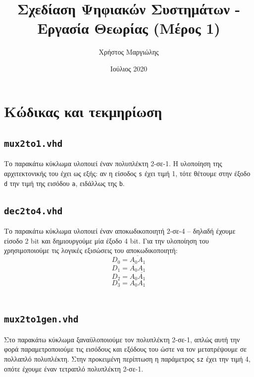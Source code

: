 \documentclass{article}
\title{Σχεδίαση Ψηφιακών Συστημάτων - Εργασία Θεωρίας (Μέρος 1)}
\author{Χρήστος Μαργιώλης}
\date{Ιούλιος 2020}
\begin{document}
\begin{titlepage}
        \maketitle
\end{titlepage}

\renewcommand{\contentsname}{Περιεχόμενα}
\tableofcontents

\section{Κώδικας και τεκμηρίωση}

\subsection{\lstinline{mux2to1.vhd}}

Το παρακάτω κύκλωμα υλοποιεί έναν πολυπλέκτη 2-σε-1. Η υλοποίηση της
αρχιτεκτονικής του έχει ως εξής: αν η είσοδος \lstinline{s} έχει
τιμή 1, τότε θέτουμε στην έξοδο \lstinline{d} την τιμή της εισόδου
\lstinline{a}, ειδάλλως της \lstinline{b}. \\


\pagebreak

\subsection{\lstinline{dec2to4.vhd}}

Το παρακάτω κύκλωμα υλοποιεί έναν αποκωδικοποιητή 2-σε-4 -- δηλαδή έχουμε
είσοδο 2 bit και δημιουργούμε μία έξοδο 4 bit. Για την υλοποίηση του 
χρησιμοποιούμε τις λογικές εξισώσεις του αποκωδικοποιητή:
\[D_0 = \overline{A_0 A_1}\]
\[D_1 = \overline{A_0} A_1\]
\[D_2 = A_0 \overline{A_1}\]
\[D_3 = A_0 A_1\] \\


\pagebreak

\subsection{\lstinline{mux2to1gen.vhd}}

Στο παρακάτω κύκλωμα ξαναϋλοποιούμε τον πολυπλέκτη 2-σε-1, απλώς αυτή
την φορά παραμετροποιούμε τις εισόδους και εξόδους του ώστε να τον
μετατρέψουμε σε πολλαπλό πολυπλέκτη. Στην προκειμένη περίπτωση η παράμετρος
\lstinline{sz} έχει την τιμή 4, οπότε έχουμε έναν τετραπλό πολυπλέκτη
2-σε-1. \\
\end{document}
